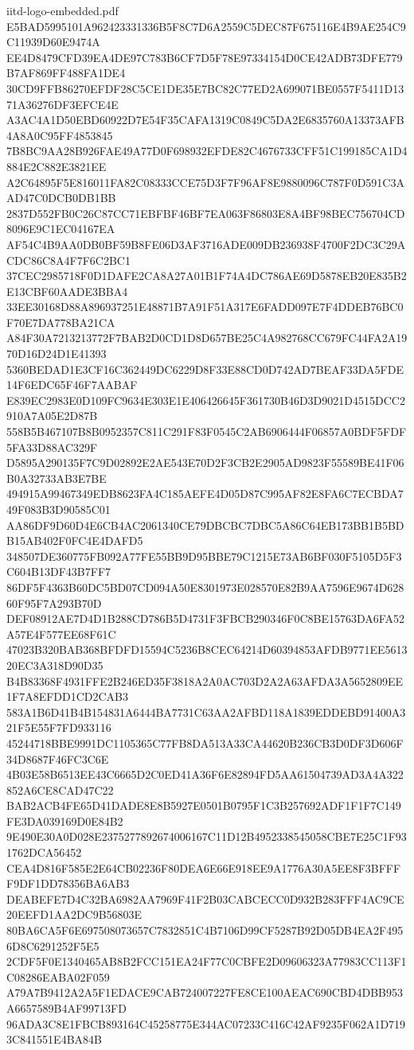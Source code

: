 \begin{filecontents*}[overwrite]{iitd-logo-embedded.pdf}
E5BAD5995101A962423331336B5F8C7D6A2559C5DEC87F675116E4B9AE254C9C11939D60E9474A
EE4D8479CFD39EA4DE97C783B6CF7D5F78E97334154D0CE42ADB73DFE779B7AF869FF488FA1DE4
30CD9FFB86270EFDF28C5CE1DE35E7BC82C77ED2A699071BE0557F5411D1371A36276DF3EFCE4E
A3AC4A1D50EBD60922D7E54F35CAFA1319C0849C5DA2E6835760A13373AFB4A8A0C95FF4853845
7B8BC9AA28B926FAE49A77D0F698932EFDE82C4676733CFF51C199185CA1D4884E2C882E3821EE
A2C64895F5E816011FA82C08333CCE75D3F7F96AF8E9880096C787F0D591C3AAD47C0DCB0DB1BB
2837D552FB0C26C87CC71EBFBF46BF7EA063F86803E8A4BF98BEC756704CD8096E9C1EC04167EA
AF54C4B9AA0DB0BF59B8FE06D3AF3716ADE009DB236938F4700F2DC3C29ACDC86C8A4F7F6C2BC1
37CEC2985718F0D1DAFE2CA8A27A01B1F74A4DC786AE69D5878EB20E835B2E13CBF60AADE3BBA4
33EE30168D88A896937251E48871B7A91F51A317E6FADD097E7F4DDEB76BC0F70E7DA778BA21CA
A84F30A7213213772F7BAB2D0CD1D8D657BE25C4A982768CC679FC44FA2A1970D16D24D1E41393
5360BEDAD1E3CF16C362449DC6229D8F33E88CD0D742AD7BEAF33DA5FDE14F6EDC65F46F7AABAF
E839EC2983E0D109FC9634E303E1E406426645F361730B46D3D9021D4515DCC2910A7A05E2D87B
558B5B467107B8B0952357C811C291F83F0545C2AB6906444F06857A0BDF5FDF5FA33D88AC329F
D5895A290135F7C9D02892E2AE543E70D2F3CB2E2905AD9823F55589BE41F06B0A32733AB3E7BE
494915A99467349EDB8623FA4C185AEFE4D05D87C995AF82E8FA6C7ECBDA749F083B3D90585C01
AA86DF9D60D4E6CB4AC2061340CE79DBCBC7DBC5A86C64EB173BB1B5BDB15AB402F0FC4E4DAFD5
348507DE360775FB092A77FE55BB9D95BBE79C1215E73AB6BF030F5105D5F3C604B13DF43B7FF7
86DF5F4363B60DC5BD07CD094A50E8301973E028570E82B9AA7596E9674D62860F95F7A293B70D
DEF08912AE7D4D1B288CD786B5D4731F3FBCB290346F0C8BE15763DA6FA52A57E4F577EE68F61C
47023B320BAB368BFDFD15594C5236B8CEC64214D60394853AFDB9771EE561320EC3A318D90D35
B4B83368F4931FFE2B246ED35F3818A2A0AC703D2A2A63AFDA3A5652809EE1F7A8EFDD1CD2CAB3
583A1B6D41B4B154831A6444BA7731C63AA2AFBD118A1839EDDEBD91400A321F5E55F7FD933116
45244718BBE9991DC1105365C77FB8DA513A33CA44620B236CB3D0DF3D606F34D8687F46FC3C6E
4B03E58B6513EE43C6665D2C0ED41A36F6E82894FD5AA61504739AD3A4A322852A6CE8CAD47C22
BAB2ACB4FE65D41DADE8E8B5927E0501B0795F1C3B257692ADF1F1F7C149FE3DA039169D0E84B2
9E490E30A0D028E2375277892674006167C11D12B4952338545058CBE7E25C1F931762DCA56452
CEA4D816F585E2E64CB02236F80DEA6E66E918EE9A1776A30A5EE8F3BFFFF9DF1DD78356BA6AB3
DEABEFE7D4C32BA6982AA7969F41F2B03CABCECC0D932B283FFF4AC9CE20EEFD1AA2DC9B56803E
80BA6CA5F6E697508073657C7832851C4B7106D99CF5287B92D05DB4EA2F4956D8C6291252F5E5
2CDF5F0E1340465AB8B2FCC151EA24F77C0CBFE2D09606323A77983CC113F1C08286EABA02F059
A79A7B9412A2A5F1EDACE9CAB724007227FE8CE100AEAC690CBD4DBB953A6657589B4AF99713FD
96ADA3C8E1FBCB893164C45258775E344AC07233C416C42AF9235F062A1D7193C841551E4BA84B

\end{filecontents*}
